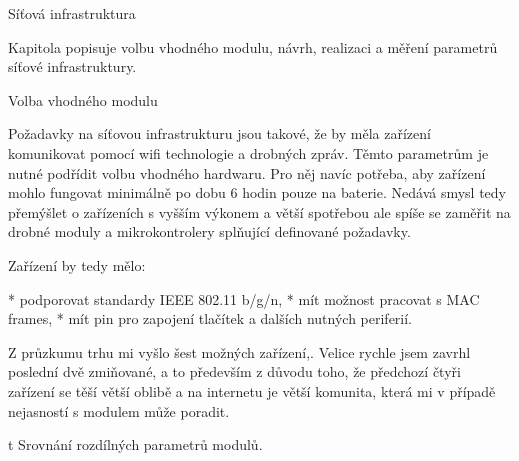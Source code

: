 
\def\ctustyle{{\ssr CTUstyle}}
\def\ttb{\tt\char`\\} %

\chap Síťová infrastruktura

Kapitola popisuje volbu vhodného modulu, návrh, realizaci a měření parametrů síťové infrastruktury.

\sec Volba vhodného modulu

Požadavky na síťovou infrastrukturu jsou takové, že by měla zařízení komunikovat pomocí wifi technologie a drobných zpráv. Těmto parametrům je nutné podřídit volbu vhodného hardwaru. Pro něj navíc potřeba, aby zařízení mohlo fungovat minimálně po dobu 6 hodin pouze na baterie. Nedává smysl tedy přemýšlet o zařízeních s vyšším výkonem a větší spotřebou ale spíše se zaměřit na drobné moduly a mikrokontrolery splňující definované požadavky.

Zařízení by tedy mělo:

\begitems
* podporovat standardy IEEE 802.11 b/g/n,
* mít možnost pracovat s MAC frames,
* mít pin pro zapojení tlačítek a dalších nutných periferií.

\enditems

Z průzkumu trhu mi vyšlo šest možných zařízení,. Velice rychle jsem zavrhl poslední dvě zmiňované, a to především z důvodu toho, že předchozí čtyři zařízení se těší větší oblibě a na internetu je větší komunita, která mi v případě nejasností s modulem může poradit.

\midinsert {}
\caption/t Srovnání rozdílných parametrů modulů.
\endinsert

